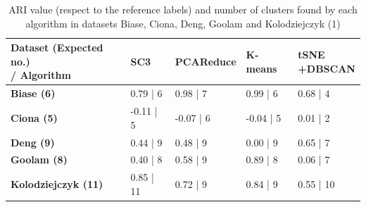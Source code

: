 \documentclass{report}
\begin{document}
{\begin{table}[H]
\centering
\caption{ARI value (respect to the reference labels) and number of clusters found by each algorithm in datasets Biase, Ciona, Deng, Goolam and Kolodziejczyk (1)}
\begin{tabular}{| l | l | l | l | l |}
\hline
\parbox[c]{5cm}{\textbf{Dataset (Expected no.)\\ / Algorithm}} & 
\parbox[c]{2cm}{\textbf{SC3}} & 
\parbox[c]{2cm}{\textbf{PCAReduce}} &
\parbox[c]{2cm}{\textbf{K-means}}&
\parbox[c]{2cm}{\textbf{tSNE\\+DBSCAN}}\\
\hline
\parbox[c]{5cm}{\textbf{Biase (6)}} & 
\parbox[c]{2cm}{0.79 | 6} & 
\parbox[c]{2cm}{0.98 | 7} &
\parbox[c]{2cm}{0.99 | 6}&
\parbox[c]{2cm}{0.68 | 4}\\
\hline
\parbox[c]{5cm}{\textbf{Ciona (5)}} & 
\parbox[c]{2cm}{-0.11 | 5} & 
\parbox[c]{2cm}{-0.07 | 6} &
\parbox[c]{2cm}{-0.04 | 5}&
\parbox[c]{2cm}{0.01 | 2}\\
\hline
\parbox[c]{5cm}{\textbf{Deng (9)}} & 
\parbox[c]{2cm}{0.44 | 9} & 
\parbox[c]{2cm}{0.48 | 9} &
\parbox[c]{2cm}{0.00 | 9}&
\parbox[c]{2cm}{0.65 | 7}\\
\hline
\parbox[c]{5cm}{\textbf{Goolam (8)}} & 
\parbox[c]{2cm}{0.40 | 8} & 
\parbox[c]{2cm}{0.58 | 9} &
\parbox[c]{2cm}{0.89 | 8}&
\parbox[c]{2cm}{0.06 | 7}\\
\hline
\parbox[c]{5cm}{\textbf{Kolodziejczyk (11)}} & 
\parbox[c]{2cm}{0.85 | 11} & 
\parbox[c]{2cm}{0.72 | 9} &
\parbox[c]{2cm}{0.84 | 9}&
\parbox[c]{2cm}{0.55 | 10}\\
\hline
\end{tabular}
\label{numberclusters11}
\end{table}

}
\end{document}
